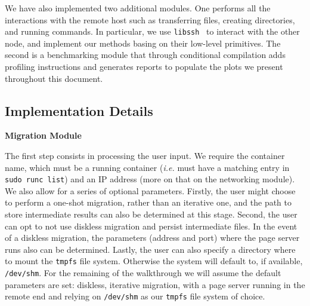 We have also implemented two additional modules.
One performs all the interactions with the remote host such as transferring
files, creating directories, and running \criu commands.
In particular, we use \texttt{libssh}~\cite{libssh} to interact with the other
node, and implement our methods basing on their low-level primitives.
The second is a benchmarking module that through conditional compilation adds
profiling instructions and generates reports to populate the plots we present
throughout this document.

\subsection{Implementation Details}

\textbf{Migration Module}

The first step consists in processing the user input.
We require the container name, which must be a running container (\textit{i.e.}
must have a matching entry in \texttt{sudo runc list}) and an IP address (more
on that on the networking module).
We also allow for a series of optional parameters.
Firstly, the user might choose to perform a one-shot migration, rather than an
iterative one, and the path to store intermediate results can also be
determined at this stage.
Second, the user can opt to not use diskless migration and persist intermediate
files.
In the event of a diskless migration, the parameters (address and port) where
the page server runs also can be determined.
Lastly, the user can also specify a directory where to mount the \texttt{tmpfs}
file system.
Otherwise the system will default to, if available, \texttt{/dev/shm}.
For the remaining of the walkthrough we will assume the default parameters are
set: diskless, iterative migration, with a page server running in the remote
end and relying on \texttt{/dev/shm} as our \texttt{tmpfs} file system of
choice.

